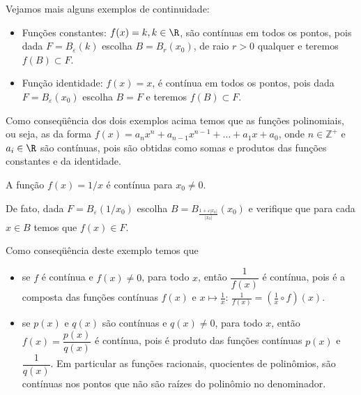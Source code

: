 \documentclass[11pt, oneside, a4paper]{gsm-l}
\begin{document}
Vejamos mais alguns exemplos de continuidade:
\begin{itemize}
  \item Funções constantes: $f(x)=k, k\in\R$, são contínuas em todos os
  pontos, pois dada $F=B_\varepsilon(k)$ escolha $B=B_r(x_0)$, de raio
  $r>0$ qualquer e teremos $f(B)\subset F$.
  \item Função identidade: $f(x)=x$, é contínua em todos os pontos, pois
  dada $F=B_\varepsilon(x_0)$ escolha $B=F$ e teremos $f(B)\subset F$.
\end{itemize}

\begin{obs}
  Como conseqüência dos dois exemplos acima temos que as funções
  polinomiais, ou seja, as da forma
  $f(x)=a_nx^n+a_{n-1}x^{n-1}+\ldots+a_1x+a_0$, onde $n\in\mathbb{Z}^+$
  e $a_i \in \R$ são contínuas, pois são obtidas como somas e produtos
  das funções constantes e da identidade.
\end{obs}

\begin{exem}
  A função $f(x)=1\slash x$ é contínua para $x_0\ne 0$.

  De fato, dada $F=B_\varepsilon(1\slash x_0)$ escolha
  $B=B_{\frac{1+\varepsilon|x_0|}{|x_0|}}(x_0)$ e verifique que para
  cada $x\in B$ temos que $f(x)\in F$.
\end{exem}

\begin{obs}
  Como conseqüência deste exemplo temos que 
  \begin{itemize}
    \item se $f$ é contínua e $f(x)\ne 0$, para todo $x$, então
    $\dfrac{1}{f(x)}$ é contínua, pois é a composta das funções
    contínuas $f(x)$ e $x\mapsto \frac{1}{x}$:
    $\frac{1}{f(x)}=\left(\frac{1}{x}\circ f\right)(x)$.
    \item se $p(x)$ e $q(x)$ são contínuas e $q(x)\ne 0$, para todo $x$,
    então $f(x)=\dfrac{p(x)}{q(x)}$ é contínua, pois é produto das
    funções contínuas $p(x)$ e $\dfrac{1}{q(x)}$. Em particular as
    funções racionais, quocientes de polinômios, são contínuas nos
    pontos que não são raízes do polinômio no denominador.
  \end{itemize}
\end{obs}

\end{document}
